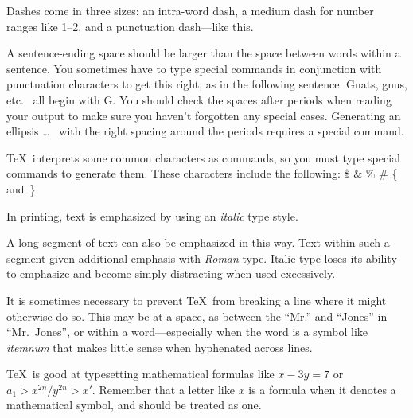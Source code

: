 \documentclass{river-journal}
\begin{document}
Dashes come in three sizes: an
       intra-word
dash, a medium dash for number ranges like
       1--2,
and a punctuation
       dash---like
this.

A sentence-ending space should be larger than the space between words
within a sentence.  You sometimes have to type special commands in
conjunction with punctuation characters to get this right, as in the
following sentence.
       Gnats, gnus, etc.\    %
       all begin with G\@.   %
You should check the spaces after periods when reading your output to
make sure you haven't forgotten any special cases.
Generating an ellipsis
       \ldots\    %
with the right spacing around the periods
requires a special  command.

\TeX\ interprets some common characters as commands, so you must type
special commands to generate them.  These characters include the
following:
       \$ \& \% \# \{ and~\}.

In printing, text is emphasized by using an
       {\em italic\/}  %
type style.

\begin{em}
   A long segment of text can also be emphasized in this way.  Text within
   such a segment given additional emphasis
      with\/ {\em Roman}
   type.  Italic type loses its ability to emphasize and become simply
   distracting when used excessively.
\end{em}

It is sometimes necessary to prevent \TeX\ from breaking a line where
it might otherwise do so.  This may be at a space, as between the
``Mr.'' and ``Jones'' in
       ``Mr.~Jones'',        %
or within a word---especially when the word is a symbol like
       \mbox{\em itemnum\/}
that makes little sense when hyphenated across
       lines.





\TeX\ is good at typesetting mathematical formulas like
       \( x-3y = 7 \)
or
       \( a_{1} > x^{2n} / y^{2n} > x' \).
Remember that a letter like
       $x$        %
is a formula when it denotes a mathematical symbol, and should
be treated as one.
\end{document}
